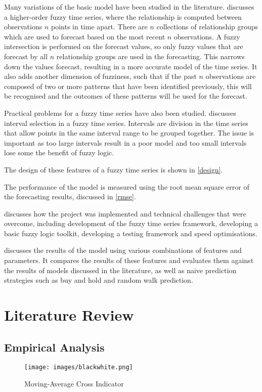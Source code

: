 \documentclass[12pt]{article}
\theoremstyle{definition}
\begin{document}
Many variations of the basic model have been studied in the literature.  discusses a higher-order fuzzy time series, where the relationship is computed between observations $n$ points in time apart. There are $n$ collections of relationship groups which are used to forecast based on the most recent $n$ observations. A fuzzy intersection is performed on the forecast values, so only fuzzy values that are forecast by all $n$ relationship groups are used in the forecasting. This narrows down the values forecast, resulting in a more accurate model of the time series. It also adds another dimension of fuzziness, such that if the past $n$ observations are composed of two or more patterns that have been identified previously, this will be recognised and the outcomes of these patterns will be used for the forecast.

Practical problems for a fuzzy time series have also been studied.  discusses interval selection in a fuzzy time series. Intervals are division in the time series that allow points in the same interval range to be grouped together. The issue is important as too large intervals result in a poor model and too small intervals lose some the benefit of fuzzy logic.

The design of these features of a fuzzy time series is shown in \cref{design}.

The performance of the model is measured using the root mean square error of the forecasting results, discussed in \cref{rmse}.

 discusses how the project was implemented and technical challenges that were overcome, including development of the fuzzy time series framework, developing a basic fuzzy logic toolkit, developing a testing framework and speed optimisations.

 discusses the results of the model using various combinations of features and parameters. It compares the results of these features and evaluates them against the results of models discussed in the literature, as well as naive prediction strategies such as buy and hold and random walk prediction.

\section{Literature Review}

\subsection{Empirical Analysis}
\label{ta}
\begin{figure}[H]
    \centering
    \texttt{[image: images/blackwhite.png]}
    \caption{Moving-Average Cross Indicator}
\end{figure}
\end{document}
